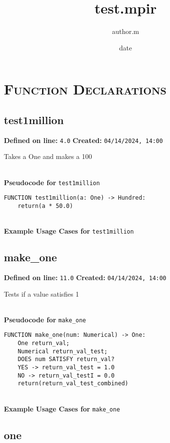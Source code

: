 \documentclass{article}
\title{test.mpir}
\author{author.m}
\date{date}
\begin{document}
\maketitle
\clearpage
\tableofcontents
\clearpage

\section{\textsc{Function Declarations}}

\subsection{test1million}

\textbf{Defined on line:} \verb|4.0| \hfill \textbf{Created:} \verb|04/14/2024, 14:00| 


Takes a One and makes a 100

\textbf{\\ Pseudocode for } \texttt{test1million}
\begin{verbatim}
FUNCTION test1million(a: One) -> Hundred:
	return(a * 50.0)
\end{verbatim}

\textbf{\\ Example Usage Cases for } \texttt{test1million}
\clearpage

\subsection{make\_one}

\textbf{Defined on line:} \verb|11.0| \hfill \textbf{Created:} \verb|04/14/2024, 14:00| 


Tests if a value satisfies 1

\textbf{\\ Pseudocode for } \texttt{make\_one}
\begin{verbatim}
FUNCTION make_one(num: Numerical) -> One:
	One return_val;
	Numerical return_val_test;
	DOES num SATISFY return_val?
	YES -> return_val_test = 1.0
	NO -> return_val_testI = 0.0
	return(return_val_test_combined)
\end{verbatim}

\textbf{\\ Example Usage Cases for } \texttt{make\_one}
\clearpage

\subsection{one}
\end{document}

